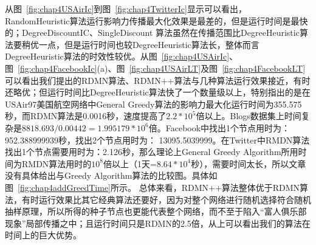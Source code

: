 从图~\ref{fig:chap4USAirIc}到图~\ref{fig:chap4TwitterIc}显示可以看出，RandomHeuristic算法运行影响力传播最大化效果是最差的，但是运行时间是最快的；DegreeDiscountIC、SingleDiscount 算法虽然在传播范围比DegreeHeuristic算法要稍优一点，但是运行时间也较DegreeHeuristic算法长，整体而言DegreeHeuristic算法的时效性较优。从图~\ref{fig:chap4USAirIc}、图~\ref{fig:chap4FacebookIc}(a)、图~\ref{fig:chap4USAirLT}及图~\ref{fig:chap4FacebookLT}可以看出我们提出的RDMN算法、RDMN++算法与几种算法运行效果接近，有时还略优；但运行时间比DegreeHeuristic算法快了一个数量级以上，特别指出的是在USAir97美国航空网络中General Greedy算法的影响力最大化运行时间为355.575秒，而RDMN算法是0.0016秒，速度提高了$2.2*10^5$倍以上。Blogs数据集上时间复杂是$8818.693/0.00442=1.995179*10^6$倍。Facebook中找出1个节点用时为：952.388999939秒，找出2个节点用时为： 13095.5039999。在Twitter中RMDN算法找出1个节点需要用时为：2.126秒，那么理论上General Greedy Algorithm所用时间为RMDN算法用时的$10^8$倍以上（1天=$8.64*10^4$秒），需要时间太长，所以文章没有具体给出与Greedy Algorithm算法的比较图。具体如图~\ref{fig:chap4addGreedTime}所示。
总体来看，RDMN++算法整体优于RDMN算法，有时运行效果比其它经典算法还要好，因为对整个网络进行随机选择符合随机抽样原理，所以所得的种子节点也更能代表整个网络，而不至于陷入“富人俱乐部现象”局部传播之中；且运行时间只是RDMN的2.5倍，从上可以看出我们的算法在时间上的巨大优势。

